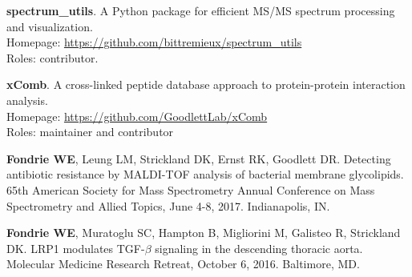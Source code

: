 \documentclass{article}
\newcommand{\mysection}[1]{\vspace{1ex {\bf \large \textrm{#1}} \quad
    \hrulefill}}
\newcommand{\myref}[1]{\href{#1}{\url{#1}}}
\begin{document}
\begin{etaremune}
 \item {\bf spectrum\_utils}. A Python package for efficient MS/MS spectrum
   processing and visualization. \\
   Homepage: \myref{https://github.com/bittremieux/spectrum_utils} \\
   Roles: contributor.

 \item {\bf xComb}. A cross-linked peptide database approach to protein-protein
   interaction analysis. \\
   Homepage: \myref{https://github.com/GoodlettLab/xComb} \\
   Roles: maintainer and contributor

\end{etaremune}

\mysection{Talks}
\begin{etaremune}
  \item {\bf Fondrie WE}, Leung LM, Strickland DK, Ernst RK, Goodlett DR.
    Detecting antibiotic resistance by MALDI-TOF analysis of bacterial membrane
    glycolipids. 65th American Society for Mass Spectrometry Annual Conference
    on Mass Spectrometry and Allied Topics, June 4-8, 2017. Indianapolis, IN.
    
  \item {\bf Fondrie WE}, Muratoglu SC, Hampton B, Migliorini M, Galisteo R,
    Strickland DK. LRP1 modulates TGF-$\beta$ signaling in the descending
    thoracic aorta. Molecular Medicine Research Retreat, October 6, 2016.
    Baltimore, MD.
\end{etaremune}
\end{document}
